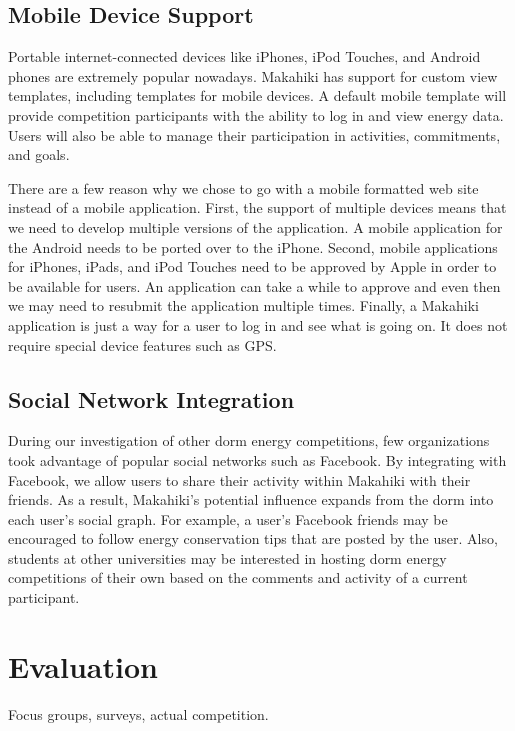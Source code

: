 \section{Mobile Device Support}
\label{mobile}

Portable internet-connected devices like iPhones, iPod Touches, and Android phones are extremely popular nowadays.  Makahiki has support for custom view templates, including templates for mobile devices.  A default mobile template will provide competition participants with the ability to log in and view energy data.  Users will also be able to manage their participation in activities, commitments, and goals.

There are a few reason why we chose to go with a mobile formatted web site instead of a mobile application.  First, the support of multiple devices means that we need to develop multiple versions of the application.  A mobile application for the Android needs to be ported over to the iPhone. Second, mobile applications for iPhones, iPads, and iPod Touches need to be approved by Apple in order to be available for users.  An application can take a while to approve and even then we may need to resubmit the application multiple times.  Finally, a Makahiki application is just a way for a user to log in and see what is going on.  It does not require special device features such as GPS.

\section{Social Network Integration}
\label{socialint}

During our investigation of other dorm energy competitions, few organizations took advantage of popular social networks such as Facebook.  By integrating with Facebook, we allow users to share their activity within Makahiki with their friends.  As a result, Makahiki's potential influence expands from the dorm into each user's social graph.  For example, a user's Facebook friends may be encouraged to follow energy conservation tips that are posted by the user.  Also, students at other universities may be interested in hosting dorm energy competitions of their own based on the comments and activity of a current participant.

\chapter{Evaluation}
\label{evaluation}

Focus groups, surveys, actual competition.

